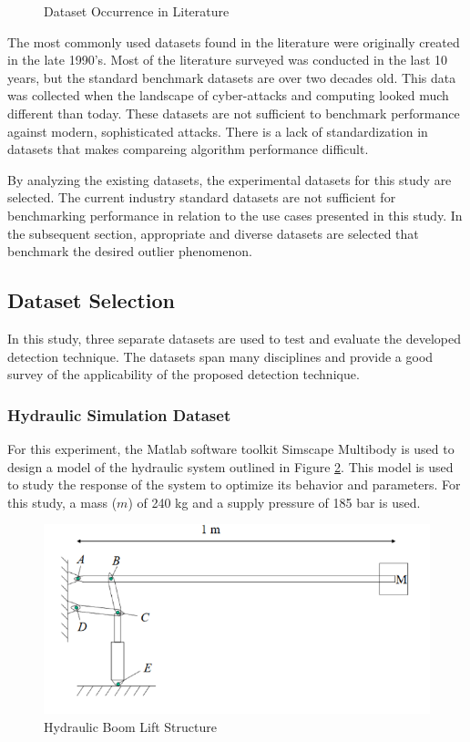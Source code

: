 \begin{figure}[H]
    
    \caption{Dataset Occurrence in Literature }
    \label{fig_dataset_lit}
\end{figure}

The most commonly used datasets found in the literature were originally created in the late 1990's.
Most of the literature surveyed was conducted in the last 10 years, but the standard benchmark datasets are over two decades old.
This data was collected when the landscape of cyber-attacks and computing looked much different than today. 
These datasets are not sufficient to benchmark performance against modern, sophisticated attacks.
There is a lack of standardization in datasets that makes compareing algorithm performance difficult.

By analyzing the existing datasets, the experimental datasets for this study are selected.
The current industry standard datasets are not sufficient for benchmarking performance in relation to the use cases presented in this study.
In the subsequent section, appropriate and diverse datasets are selected that benchmark the desired outlier phenomenon.

\subsection{Dataset Selection}
\label{ref_datasets}

In this study, three separate datasets are used to test and evaluate the developed detection technique.
The datasets span many disciplines and provide a good survey of the applicability of the proposed detection technique.

\subsubsection{Hydraulic Simulation Dataset}
\label{ref_hydraulic_dataset}

For this experiment, the Matlab software toolkit Simscape Multibody is used to design a model of the hydraulic system outlined in Figure \ref{fig:boom_structure}.
This model is used to study the response of the system to optimize its behavior and parameters.
For this study, a mass ($m$) of 240 kg and a supply pressure of 185 bar is used.

\begin{figure}[H]
    \includegraphics[width=\textwidth]{1_hydraulic_sim/BoomStructure.PNG}
    \caption{Hydraulic Boom Lift Structure}
    \label{fig:boom_structure}
\end{figure}


